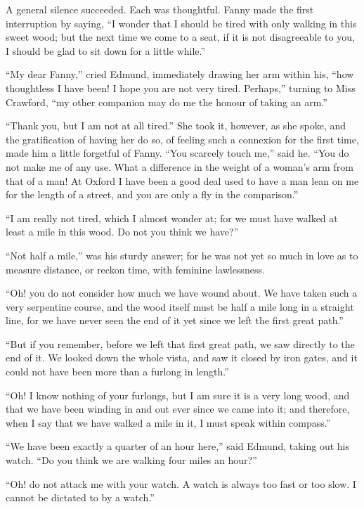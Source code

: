 A general silence succeeded.  Each was thoughtful.
Fanny made the first interruption by saying, ``I wonder
that I should be tired with only walking in this sweet wood;
but the next time we come to a seat, if it is not disagreeable
to you, I should be glad to sit down for a little while.''

``My dear Fanny,'' cried Edmund, immediately drawing her arm
within his, ``how thoughtless I have been!  I hope you
are not very tired.  Perhaps,'' turning to Miss Crawford,
``my other companion may do me the honour of taking an arm.''

``Thank you, but I am not at all tired.''  She took it,
however, as she spoke, and the gratification of having
her do so, of feeling such a connexion for the first time,
made him a little forgetful of Fanny.  ``You scarcely
touch me,'' said he.  ``You do not make me of any use.
What a difference in the weight of a woman's arm from
that of a man!  At Oxford I have been a good deal used
to have a man lean on me for the length of a street,
and you are only a fly in the comparison.''

``I am really not tired, which I almost wonder at;
for we must have walked at least a mile in this wood.
Do not you think we have?''

``Not half a mile,'' was his sturdy answer; for he was not yet
so much in love as to measure distance, or reckon time,
with feminine lawlessness.

``Oh! you do not consider how much we have wound about.
We have taken such a very serpentine course, and the wood
itself must be half a mile long in a straight line,
for we have never seen the end of it yet since we left
the first great path.''

``But if you remember, before we left that first great path,
we saw directly to the end of it.  We looked down the
whole vista, and saw it closed by iron gates, and it
could not have been more than a furlong in length.''

``Oh!  I know nothing of your furlongs, but I am sure
it is a very long wood, and that we have been winding
in and out ever since we came into it; and therefore,
when I say that we have walked a mile in it, I must speak
within compass.''

``We have been exactly a quarter of an hour here,''
said Edmund, taking out his watch.  ``Do you think we
are walking four miles an hour?''

``Oh! do not attack me with your watch.  A watch is always
too fast or too slow.  I cannot be dictated to by a watch.''

